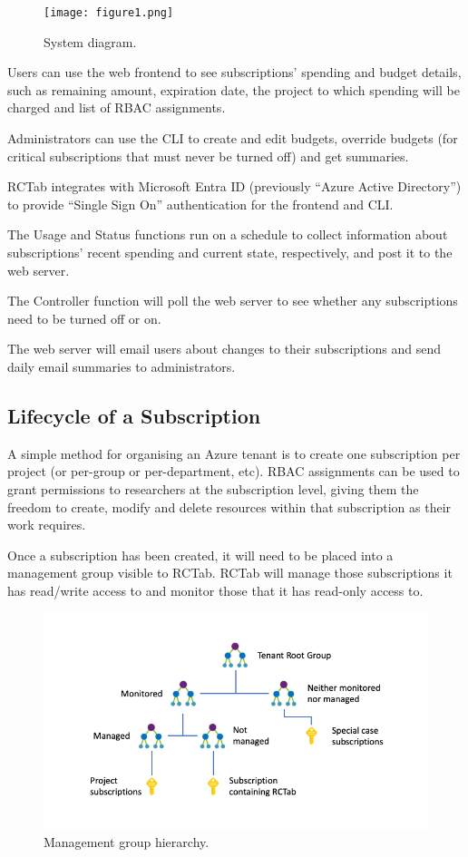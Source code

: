 \documentclass[
]{article}
\begin{document}
\begin{figure}
\centering
\texttt{[image: figure1.png]}
\caption{System diagram.\label{fig:Figure 1}}
\end{figure}

Users can use the web frontend to see subscriptions' spending and budget
details, such as remaining amount, expiration date, the project to which
spending will be charged and list of RBAC assignments.

Administrators can use the CLI to create and edit budgets, override
budgets (for critical subscriptions that must never be turned off) and
get summaries.

RCTab integrates with Microsoft Entra ID (previously ``Azure Active
Directory'') to provide ``Single Sign On'' authentication for the
frontend and CLI.

The Usage and Status functions run on a schedule to collect information
about subscriptions' recent spending and current state, respectively,
and post it to the web server.

The Controller function will poll the web server to see whether any
subscriptions need to be turned off or on.

The web server will email users about changes to their subscriptions and
send daily email summaries to administrators.

\subsection{Lifecycle of a
Subscription}\label{lifecycle-of-a-subscription}

A simple method for organising an Azure tenant is to create one
subscription per project (or per-group or per-department, etc). RBAC
assignments can be used to grant permissions to researchers at the
subscription level, giving them the freedom to create, modify and delete
resources within that subscription as their work requires.

Once a subscription has been created, it will need to be placed into a
management group visible to RCTab. RCTab will manage those subscriptions
it has read/write access to and monitor those that it has read-only
access to.

\begin{figure}
\centering
\includegraphics{figure2.png}
\caption{Management group hierarchy.\label{fig:Figure 2}}
\end{figure}
\end{document}
